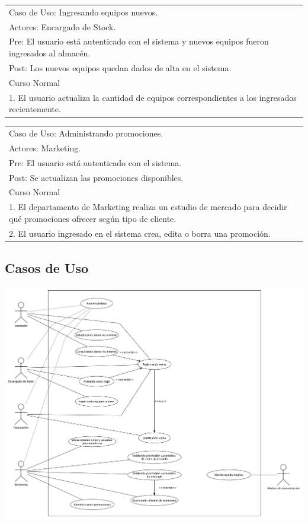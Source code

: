 \vspace{1cm}

\begin{tabular}{ | p{14cm} | }
  \hline
  Caso de Uso: Ingresando equipos nuevos. \\
  Actores: Encargado de Stock. \\
  Pre: El usuario está autenticado con el sistema y nuevos equipos fueron ingresados al almacén. \\
  Post: Los nuevos equipos quedan dados de alta en el sistema. \\
  \hline
  Curso Normal\\
  \hline
  1. El usuario actualiza la cantidad de equipos correspondientes a los ingresados recientemente. \\
  \hline
\end{tabular}

\vspace{1cm}

\begin{tabular}{ | p{14cm} | }
  \hline
  Caso de Uso: Administrando promociones. \\
  Actores: Marketing. \\
  Pre: El usuario está autenticado con el sistema. \\
  Post: Se actualizan las promociones disponibles. \\
  \hline
  Curso Normal\\
  \hline
  1. El departamento de Marketing realiza un estudio de mercado para decidir qué promociones ofrecer según tipo de cliente. \\
  2. El usuario ingresado en el sistema crea, edita o borra una promoción. \\
  \hline
\end{tabular}

\subsection{Casos de Uso}

\includegraphics[width=1.3\textwidth, angle=90]{./imagenes/casos_de_uso.pdf}

